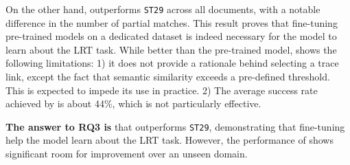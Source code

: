 On the other hand, \kashif outperforms \texttt{ST29} across all documents, with a notable difference in the number of partial matches. This result proves that fine-tuning pre-trained models on a dedicated dataset is indeed necessary for the model to learn about the LRT task.  While better than the pre-trained model, \kashif shows the following limitations: 1) it does not provide a rationale behind selecting a trace link, except the fact that semantic similarity exceeds a pre-defined threshold. This is expected to impede its use in practice.  2) The average success rate achieved by \kashif is about 44\%, which is not particularly effective. %



\begin{tcolorbox}[arc=1mm,width=\columnwidth,
                  top=0mm,left=0mm,  right=0mm, bottom=0mm,
                  boxrule=1pt, colback=violet!15!white,colframe=white]
\textbf{The answer to RQ3 is} that \kashif outperforms \texttt{ST29}, demonstrating that fine-tuning help the model learn about the LRT task. However, the performance of \kashif shows significant room for improvement over an unseen domain.
\end{tcolorbox}
